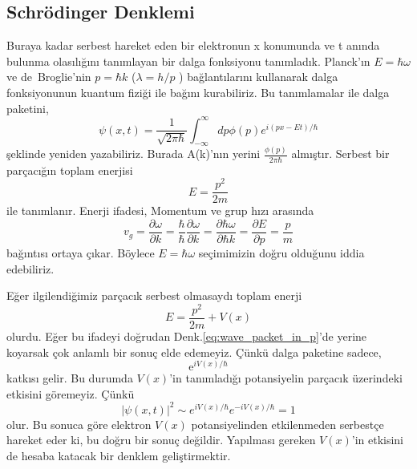 \documentclass[a4paper,12pt, twoside]{article}
\begin{document}
\subsection{Schrödinger Denklemi}

Buraya kadar serbest hareket eden bir elektronun x konumunda ve t anında bulunma olasılığını tanımlayan bir dalga fonksiyonu tanımladık. Planck'ın $E=\hbar\omega$  ve de~Broglie'nin $p=\hbar k$  ($\lambda = h/p$ )  bağlantılarını kullanarak  dalga fonksiyonunun kuantum fiziği ile bağını kurabiliriz.  Bu tanımlamalar ile dalga paketini,
\begin{equation}
\psi \left( x,t\right) =\dfrac {1}{\sqrt {2\pi \hbar }}\int ^{\infty }_{-\infty }dp\phi \left( p\right) e^{i\left( px-Et\right) /\hbar }
\label{eq:wave_packet_in_p}
\end{equation}
şeklinde yeniden yazabiliriz.  Burada A(k)'nın  yerini $\frac{\phi(p)}{2\pi\hbar}$  almıştır.  Serbest bir parçacığın toplam enerjisi
\begin{equation}
E=\dfrac {p^{2}}{2m}
\label{eq:free_particle_E}
\end{equation}
ile tanımlanır.  Enerji ifadesi,  Momentum ve grup hızı arasında
\begin{equation*}
v_{g}=\dfrac {\partial \omega }{\partial k}=\dfrac {\hbar }{\hbar }\dfrac {\partial \omega }{\partial k}=\dfrac {\partial\hbar \omega }{\partial \hbar k}=\dfrac {\partial E}{\partial p}=\dfrac {p}{m}
\end{equation*}
bağıntısı ortaya çıkar.  Böylece $E=\hbar \omega$ seçimimizin doğru olduğunu iddia edebiliriz. 

Eğer ilgilendiğimiz parçacık serbest olmasaydı toplam enerji
\begin{equation}
E=\dfrac {p^{2}}{2m} + V(x)
\label{eq:non_free_particle_E}
\end{equation}
olurdu.  Eğer bu ifadeyi doğrudan Denk.\ref{eq:wave_packet_in_p}'de yerine koyarsak çok anlamlı bir sonuç elde edemeyiz.  Çünkü dalga paketine sadece,
\begin{equation*}
\text{e}^{iV\left( x\right) /\hbar }
\end{equation*}
katkısı gelir.  Bu durumda $V(x)$'in  tanımladığı potansiyelin parçacık üzerindeki etkisini göremeyiz.  Çünkü
\begin{equation*}
\left| \psi \left( x,t\right) \right| ^{2}\sim e^{iV\left( x\right) /\hbar }e^{-iV\left( x\right) /\hbar }=1
\end{equation*}
olur. Bu sonuca göre elektron $V(x)$  potansiyelinden  etkilenmeden serbestçe hareket eder ki,  bu doğru bir  sonuç değildir. Yapılması gereken $V(x)$'in etkisini de hesaba katacak bir denklem geliştirmektir.
\end{document}
